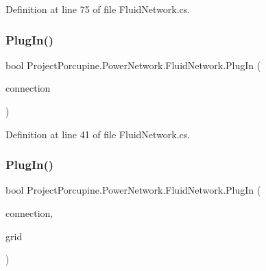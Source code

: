 Definition at line 75 of file Fluid\+Network.\+cs.

\mbox{\label{class_project_porcupine_1_1_power_network_1_1_fluid_network_a596b3ddd907bf29d06b21a72921a3b88}} 
\subsubsection{\texorpdfstring{Plug\+In()}{PlugIn()}\hspace{0.1cm}{\footnotesize\ttfamily [1/2]}}
{\footnotesize\ttfamily bool Project\+Porcupine.\+Power\+Network.\+Fluid\+Network.\+Plug\+In (\begin{DoxyParamCaption}\item[{\hyperlink{interface_project_porcupine_1_1_power_network_1_1_i_pluggable}{I\+Pluggable}}]{connection }\end{DoxyParamCaption})}



Definition at line 41 of file Fluid\+Network.\+cs.

\mbox{\label{class_project_porcupine_1_1_power_network_1_1_fluid_network_a9155ce52d47f07a8f55e4f62e7c82934}} 
\subsubsection{\texorpdfstring{Plug\+In()}{PlugIn()}\hspace{0.1cm}{\footnotesize\ttfamily [2/2]}}
{\footnotesize\ttfamily bool Project\+Porcupine.\+Power\+Network.\+Fluid\+Network.\+Plug\+In (\begin{DoxyParamCaption}\item[{\hyperlink{interface_project_porcupine_1_1_power_network_1_1_i_pluggable}{I\+Pluggable}}]{connection,  }\item[{\hyperlink{class_project_porcupine_1_1_power_network_1_1_grid}{Grid}}]{grid }\end{DoxyParamCaption})}



